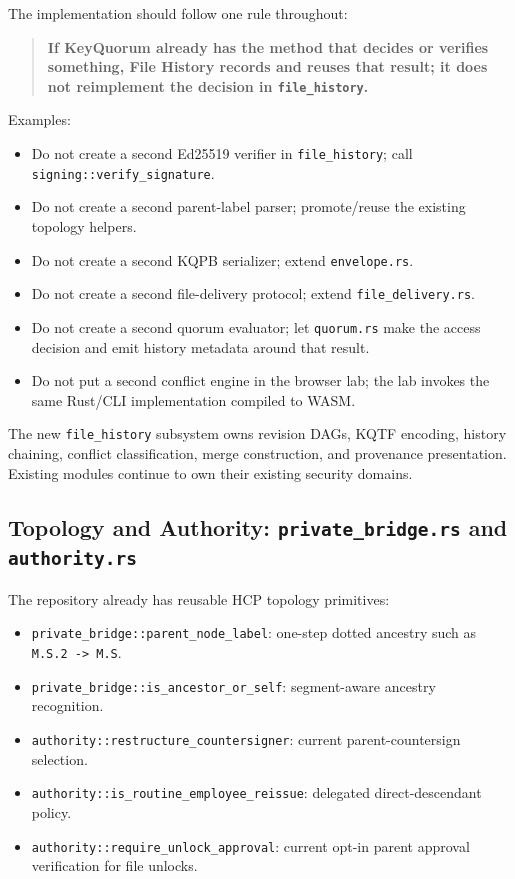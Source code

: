 \documentclass[11pt]{article}
\begin{document}
The implementation should follow one rule throughout:

\begin{quote}
\textbf{If KeyQuorum already has the method that decides or verifies something, File History records and reuses that result; it does not reimplement the decision in \texttt{file\_history}.}
\end{quote}

Examples:

\begin{itemize}[leftmargin=1.5em]
  \item Do not create a second Ed25519 verifier in \texttt{file\_history}; call \texttt{signing::verify\_signature}.
  \item Do not create a second parent-label parser; promote/reuse the existing topology helpers.
  \item Do not create a second KQPB serializer; extend \texttt{envelope.rs}.
  \item Do not create a second file-delivery protocol; extend \texttt{file\_delivery.rs}.
  \item Do not create a second quorum evaluator; let \texttt{quorum.rs} make the access decision and emit history metadata around that result.
  \item Do not put a second conflict engine in the browser lab; the lab invokes the same Rust/CLI implementation compiled to WASM.
\end{itemize}

The new \texttt{file\_history} subsystem owns revision DAGs, KQTF encoding, history chaining, conflict classification, merge construction, and provenance presentation. Existing modules continue to own their existing security domains.

\subsection{Topology and Authority: \texttt{private\_bridge.rs} and \texttt{authority.rs}}

The repository already has reusable HCP topology primitives:

\begin{itemize}[leftmargin=1.5em]
  \item \texttt{private\_bridge::parent\_node\_label}: one-step dotted ancestry such as \texttt{M.S.2 -> M.S}.
  \item \texttt{private\_bridge::is\_ancestor\_or\_self}: segment-aware ancestry recognition.
  \item \texttt{authority::restructure\_countersigner}: current parent-countersign selection.
  \item \texttt{authority::is\_routine\_employee\_reissue}: delegated direct-descendant policy.
  \item \texttt{authority::require\_unlock\_approval}: current opt-in parent approval verification for file unlocks.
\end{itemize}
\end{document}
